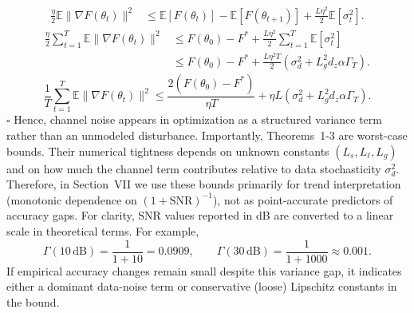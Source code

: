 \documentclass[10pt,journal]{IEEEtran}
\begin{document}
\begin{equation}
\begin{aligned}
\frac{\eta}{2}\mathbb{E}\|\nabla F(\theta_t)\|^2
&\le
\mathbb{E}[F(\theta_t)]
-
\mathbb{E}[F(\theta_{t+1})]
+
\frac{L\eta^2}{2}\mathbb{E}[\sigma_t^2].
\end{aligned}
\end{equation}
\begin{equation}
\begin{aligned}
\frac{\eta}{2}\sum_{t=1}^{T}\mathbb{E}\|\nabla F(\theta_t)\|^2
&\le
F(\theta_0)-F^*
+
\frac{L\eta^2}{2}\sum_{t=1}^{T}\mathbb{E}[\sigma_t^2] \\
&\le
F(\theta_0)-F^*
+
\frac{L\eta^2T}{2}
\left(\sigma_d^2+L_g^2d_z\alpha\Gamma_T\right).
\end{aligned}
\end{equation}
\begin{equation}
\frac{1}{T}\sum_{t=1}^{T}\mathbb{E}\|\nabla F(\theta_t)\|^2
\le
\frac{2(F(\theta_0)-F^*)}{\eta T}
+
\eta L\left(\sigma_d^2+L_g^2d_z\alpha\Gamma_T\right).
\end{equation}
\hfill $\square$
Hence, channel noise appears in optimization as a structured variance term rather than an unmodeled disturbance.
Importantly, Theorems~1-3 are worst-case bounds. Their numerical tightness depends on unknown constants $(L_s,L_\ell,L_g)$ and on how much the channel term contributes relative to data stochasticity $\sigma_d^2$. Therefore, in Section~VII we use these bounds primarily for trend interpretation (monotonic dependence on $(1+\mathrm{SNR})^{-1}$), not as point-accurate predictors of accuracy gaps.
For clarity, SNR values reported in dB are converted to a linear scale in theoretical terms. For example,
\begin{equation}
\Gamma(10\,\mathrm{dB})=\frac{1}{1+10}=0.0909,
\qquad
\Gamma(30\,\mathrm{dB})=\frac{1}{1+1000}\approx 0.001.
\end{equation}
If empirical accuracy changes remain small despite this variance gap, it indicates either a dominant data-noise term or conservative (loose) Lipschitz constants in the bound.
\end{document}
